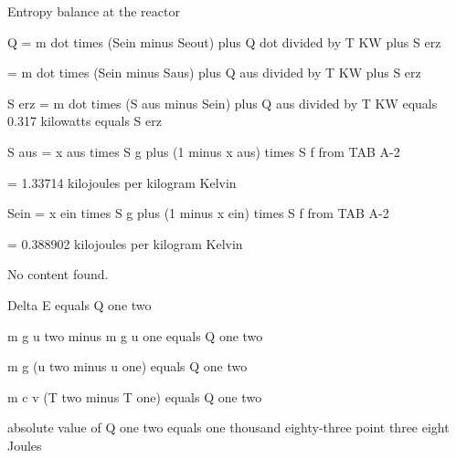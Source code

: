 Entropy balance at the reactor

Q = m dot times (Sein minus Seout) plus Q dot divided by T KW plus S erz

= m dot times (Sein minus Saus) plus Q aus divided by T KW plus S erz

S erz = m dot times (S aus minus Sein) plus Q aus divided by T KW equals 0.317 kilowatts equals S erz

S aus = x aus times S g plus (1 minus x aus) times S f from TAB A-2

= 1.33714 kilojoules per kilogram Kelvin

Sein = x ein times S g plus (1 minus x ein) times S f from TAB A-2

= 0.388902 kilojoules per kilogram Kelvin

No content found.

Delta E equals Q one two

m g u two minus m g u one equals Q one two

m g (u two minus u one) equals Q one two

m c v (T two minus T one) equals Q one two

absolute value of Q one two equals one thousand eighty-three point three eight Joules